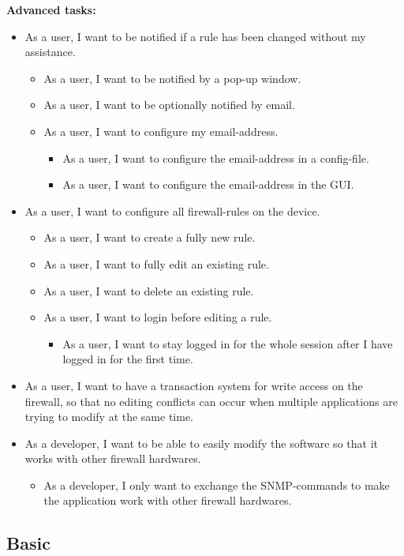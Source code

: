 \documentclass[11pt, a4paper]{article}
\begin{document}
 \textbf{Advanced tasks:}
\begin{itemize}
\item As a user, I want to be notified if a rule has been changed without my assistance.
\begin{itemize}
\item As a user, I want to be notified by a pop-up window.
\item As a user, I want to be optionally notified by email.
\item As a user, I want to configure my email-address.
\begin{itemize}
\item As a user, I want to configure the email-address in a config-file.
\item As a user, I want to configure the email-address in the GUI.
\end{itemize}
\end{itemize}
\item As a user, I want to configure all firewall-rules on the device.
\begin{itemize}
\item As a user, I want to create a fully new rule.
\item As a user, I want to fully edit an existing rule.
\item As a user, I want to delete an existing rule.
\item As a user, I want to login before editing a rule.
\begin{itemize}
\item As a user, I want to stay logged in for the whole session after I have logged in for the first time.
\end{itemize}
\end{itemize}
\item As a user, I want to have a transaction system for write access on the firewall, so that no editing conflicts can occur when multiple applications are trying to modify at the same time.
\item As a developer, I want to be able to easily modify the software so that it works with other firewall hardwares.
\begin{itemize}
\item As a developer, I only want to exchange the SNMP-commands to make the application work with other firewall hardwares.
\end{itemize}
\end{itemize}

\subsection{Basic}
\end{document}
